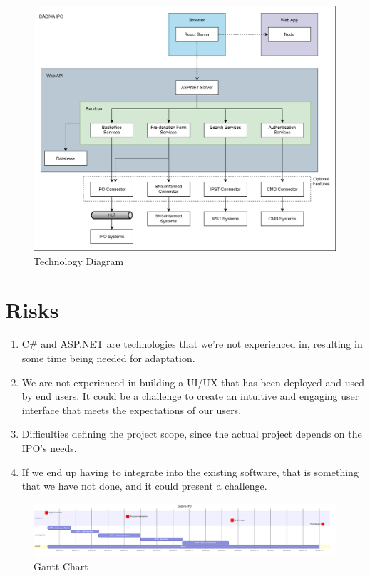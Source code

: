 \documentclass[a4paper,11pt]{article}
\begin{document}
\begin{figure}[h]
\centering
\includegraphics[width=\textwidth,height=\textheight,keepaspectratio]{tech_diagram}
\caption{Technology Diagram}
\end{figure}

\section{Risks}
\begin{enumerate}
	\item C\# \cite{csharp} and ASP.NET are technologies that we’re not experienced in, resulting in some time being needed for adaptation.

	\item We are not experienced in building a UI/UX that has been deployed and used by end users. It could be a challenge to create an intuitive and engaging user interface that meets the expectations of our users.

	\item Difficulties defining the project scope, since the actual project depends on the IPO's needs.

	\item If we end up having to integrate into the existing software, that is something that we have not done, and it could present a challenge.
\end{enumerate}

\begin{figure}[h]
\centering
\includegraphics[width=\textwidth,height=\textheight,keepaspectratio]{gantt_chart}
\caption{Gantt Chart}
\end{figure}
\end{document}
